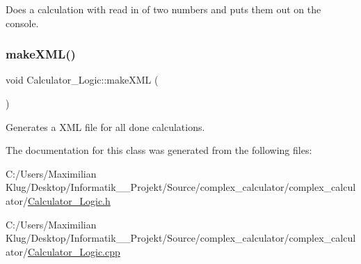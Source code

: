Does a calculation with read in of two numbers and puts them out on the console. 

\mbox{\label{class_calculator___logic_acbfb4467582baf8386d841b8ea1e7f7b}} 
\subsubsection{\texorpdfstring{make\+X\+M\+L()}{makeXML()}}
{\footnotesize\ttfamily void Calculator\+\_\+\+Logic\+::make\+X\+ML (\begin{DoxyParamCaption}{ }\end{DoxyParamCaption})}



Generates a X\+ML file for all done calculations. 



The documentation for this class was generated from the following files\+:\begin{DoxyCompactItemize}
\item 
C\+:/\+Users/\+Maximilian Klug/\+Desktop/\+Informatik\+\_\+\_\+\+Projekt/\+Source/complex\+\_\+calculator/complex\+\_\+calculator/\mbox{\hyperlink{_calculator___logic_8h}{Calculator\+\_\+\+Logic.\+h}}\item 
C\+:/\+Users/\+Maximilian Klug/\+Desktop/\+Informatik\+\_\+\_\+\+Projekt/\+Source/complex\+\_\+calculator/complex\+\_\+calculator/\mbox{\hyperlink{_calculator___logic_8cpp}{Calculator\+\_\+\+Logic.\+cpp}}\end{DoxyCompactItemize}
